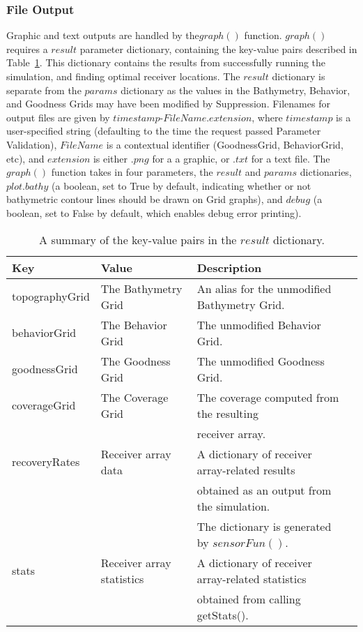 \subsubsection{File Output}
Graphic and text outputs are handled by the$ graph()$ function.  $graph()$ requires a $result$ parameter dictionary, containing the key-value pairs described in Table~\ref{resultDict}.  This dictionary contains the results from successfully running the simulation, and finding optimal receiver locations.  The $result$ dictionary is separate from the $params$ dictionary as the values in the Bathymetry, Behavior, and Goodness Grids may have been modified by Suppression.  Filenames for output files are given by $timestamp$-$FileName$.$extension$, where $timestamp$ is a user-specified string (defaulting to the time the request passed Parameter Validation), $FileName$ is a contextual identifier (GoodnessGrid, BehaviorGrid, etc), and $extension$ is either $.png$ for a a graphic, or $.txt$ for a text file.  The $graph()$ function takes in four parameters, the $result$ and $params$ dictionaries, $plot.bathy$ (a boolean, set to True by default, indicating whether or not bathymetric contour lines should be drawn on Grid graphs), and $debug$ (a boolean, set to False by default, which enables debug error printing).

\begin{table}[ht]
	\begin{tabular}{l l l l}
		Key	&	Value &	Description\\
		\hline
		topographyGrid	&	The Bathymetry Grid	&	An alias for the unmodified Bathymetry Grid.\\
		behaviorGrid	&	The Behavior Grid			&	The unmodified Behavior Grid.\\
		goodnessGrid	&	The Goodness Grid			&	The unmodified Goodness Grid.\\
		coverageGrid	& 	The Coverage Grid			&	The coverage computed from the resulting\\
						&								&	receiver array.\\
		recoveryRates	& 	Receiver array data			&	A dictionary of receiver array-related results\\
						&								&  obtained as an output from the simulation. \\ &								&  The dictionary is generated by $sensorFun()$.\\
		stats			& 	Receiver array statistics	&	A dictionary of receiver array-related statistics\\
						&								&  obtained from calling getStats().\\
	\end{tabular}
	\caption{A summary of the key-value pairs in the $result$ dictionary.
		\label{resultDict}}
\end{table}



